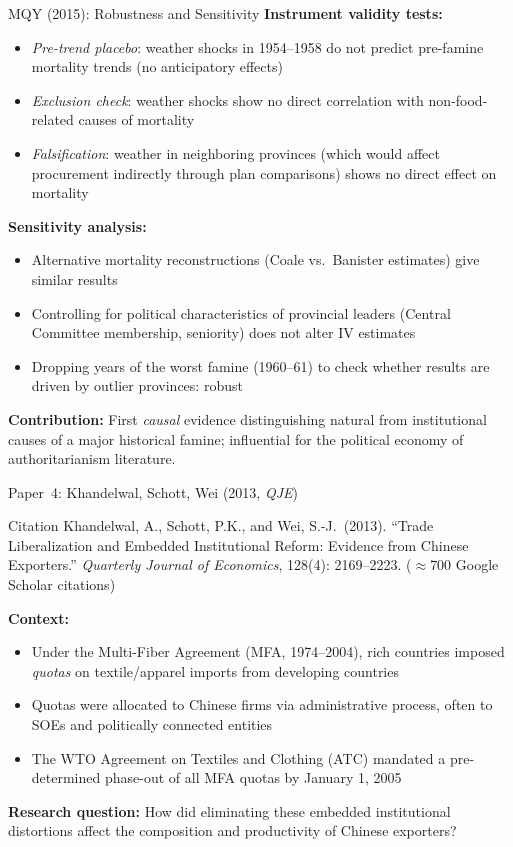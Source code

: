 \documentclass{beamer}
\begin{document}
\begin{frame}{MQY (2015): Robustness and Sensitivity}
\textbf{Instrument validity tests:}
\begin{itemize}
  \item \emph{Pre-trend placebo}: weather shocks in 1954--1958 do not
        predict pre-famine mortality trends (no anticipatory effects)
  \item \emph{Exclusion check}: weather shocks show no direct correlation
        with non-food-related causes of mortality
  \item \emph{Falsification}: weather in neighboring provinces (which
        would affect procurement indirectly through plan comparisons)
        shows no direct effect on mortality
\end{itemize}

\medskip
\textbf{Sensitivity analysis:}
\begin{itemize}
  \item Alternative mortality reconstructions (Coale vs.\ Banister
        estimates) give similar results
  \item Controlling for political characteristics of provincial leaders
        (Central Committee membership, seniority) does not alter IV estimates
  \item Dropping years of the worst famine (1960--61) to check
        whether results are driven by outlier provinces: robust
\end{itemize}

\medskip
\textbf{Contribution:} First \emph{causal} evidence distinguishing natural from
institutional causes of a major historical famine; influential for the
political economy of authoritarianism literature.
\end{frame}

\begin{frame}{Paper~4: Khandelwal, Schott, Wei (2013, \emph{QJE})}
\begin{block}{Citation}
  Khandelwal, A., Schott, P.K., and Wei, S.-J.\ (2013).
  ``Trade Liberalization and Embedded Institutional Reform: Evidence from
  Chinese Exporters.''
  \textit{Quarterly Journal of Economics}, 128(4): 2169--2223.
  {\small($\approx$700 Google Scholar citations)}
\end{block}

\textbf{Context:}
\begin{itemize}
  \item Under the Multi-Fiber Agreement (MFA, 1974--2004), rich countries
        imposed \emph{quotas} on textile/apparel imports from developing
        countries
  \item Quotas were allocated to Chinese firms via administrative process,
        often to SOEs and politically connected entities
  \item The WTO Agreement on Textiles and Clothing (ATC) mandated
        a pre-determined phase-out of all MFA quotas by January 1, 2005
\end{itemize}

\textbf{Research question:} How did eliminating these embedded institutional
distortions affect the composition and productivity of Chinese exporters?
\end{frame}
\end{document}
